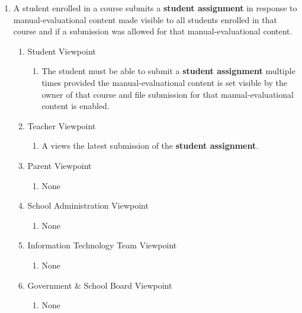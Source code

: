 \documentclass[]{article}
\begin{document}
\begin{enumerate}[{BE}1.]
	\item A student enrolled in a course submits a \textbf{student assignment} in response to manual-evaluational content made visible to all students enrolled in that course and if a submission was allowed for that manual-evaluational content.
	\begin{enumerate}[{VP2}.1]
		\item Student Viewpoint
			\begin{enumerate}
				\item The student must be able to submit a \textbf{student assignment} multiple times provided the manual-evaluational content is set visible by the owner of that course and file submission for that manual-evaluational content is enabled.
			\end{enumerate}
		\item Teacher Viewpoint
			\begin{enumerate}
				\item A views the latest submission of the \textbf{student assignment}.
			\end{enumerate}
		\item Parent Viewpoint
			\begin{enumerate}
				\item None
			\end{enumerate}
		\item School Administration Viewpoint
			\begin{enumerate}
				\item None
			\end{enumerate}
		\item Information Technology Team Viewpoint
			\begin{enumerate}
				\item None
			\end{enumerate}
		\item Government \& School Board Viewpoint
			\begin{enumerate}
				\item None
			\end{enumerate}
	\end{enumerate}


\end{enumerate}
\end{document}
